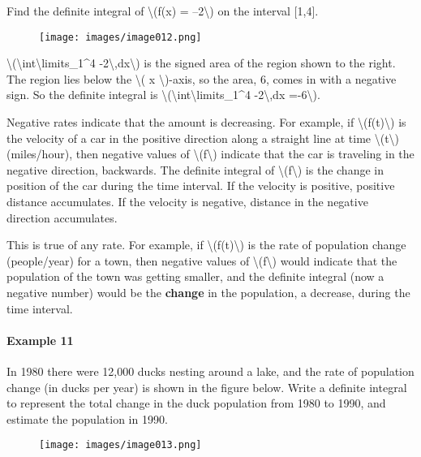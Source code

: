 Find the definite integral of \textbackslash{}(f(x) =
--2\textbackslash{}) on the interval {[}1,4{]}.

\begin{figure}
\centering
\texttt{[image: images/image012.png]}
\caption{}
\end{figure}

\textbackslash{}(\textbackslash{}int\textbackslash{}limits\_1\^{}4
-2\textbackslash{},dx\textbackslash{}) is the signed area of the region
shown to the right. The region lies below the \textbackslash{}( x
\textbackslash{})-axis, so the area, 6, comes in with a negative sign.
So the definite integral is
\textbackslash{}(\textbackslash{}int\textbackslash{}limits\_1\^{}4
-2\textbackslash{},dx =-6\textbackslash{}).

Negative rates indicate that the amount is decreasing. For example, if
\textbackslash{}(f(t)\textbackslash{}) is the velocity of a car in the
positive direction along a straight line at time
\textbackslash{}(t\textbackslash{}) (miles/hour), then negative values
of \textbackslash{}(f\textbackslash{}) indicate that the car is
traveling in the negative direction, backwards. The definite integral of
\textbackslash{}(f\textbackslash{}) is the change in position of the car
during the time interval. If the velocity is positive, positive distance
accumulates. If the velocity is negative, distance in the negative
direction accumulates.

This is true of any rate. For example, if
\textbackslash{}(f(t)\textbackslash{}) is the rate of population change
(people/year) for a town, then negative values of
\textbackslash{}(f\textbackslash{}) would indicate that the population
of the town was getting smaller, and the definite integral (now a
negative number) would be the \textbf{change} in the population, a
decrease, during the time interval.

\hypertarget{example-11}{%
\paragraph{Example 11}\label{example-11}}

In 1980 there were 12,000 ducks nesting around a lake, and the rate of
population change (in ducks per year) is shown in the figure below.
Write a definite integral to represent the total change in the duck
population from 1980 to 1990, and estimate the population in 1990.

\begin{figure}
\centering
\texttt{[image: images/image013.png]}
\caption{}
\end{figure}

